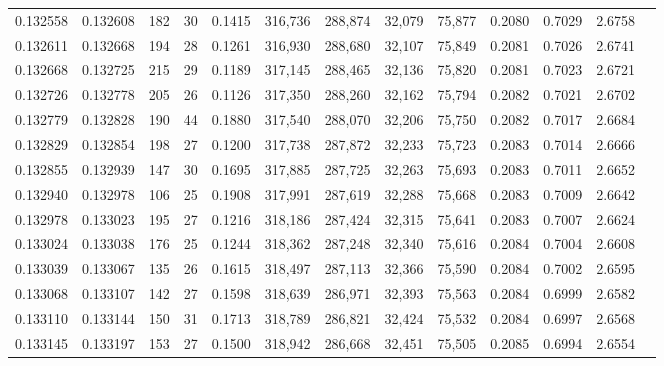 \begin{tabular}{rrrrrrrrrrrrr}
0.132558 & 0.132608 & 182 &  30 &                                     0.1415 & 316,736 & 288,874 &  32,079 &  75,877 & 0.2080 & 0.7029 & 2.6758 \\
0.132611 & 0.132668 & 194 &  28 &                                     0.1261 & 316,930 & 288,680 &  32,107 &  75,849 & 0.2081 & 0.7026 & 2.6741 \\
0.132668 & 0.132725 & 215 &  29 &                                     0.1189 & 317,145 & 288,465 &  32,136 &  75,820 & 0.2081 & 0.7023 & 2.6721 \\
0.132726 & 0.132778 & 205 &  26 &                                     0.1126 & 317,350 & 288,260 &  32,162 &  75,794 & 0.2082 & 0.7021 & 2.6702 \\
0.132779 & 0.132828 & 190 &  44 &                                     0.1880 & 317,540 & 288,070 &  32,206 &  75,750 & 0.2082 & 0.7017 & 2.6684 \\
0.132829 & 0.132854 & 198 &  27 &                                     0.1200 & 317,738 & 287,872 &  32,233 &  75,723 & 0.2083 & 0.7014 & 2.6666 \\
0.132855 & 0.132939 & 147 &  30 &                                     0.1695 & 317,885 & 287,725 &  32,263 &  75,693 & 0.2083 & 0.7011 & 2.6652 \\
0.132940 & 0.132978 & 106 &  25 &                                     0.1908 & 317,991 & 287,619 &  32,288 &  75,668 & 0.2083 & 0.7009 & 2.6642 \\
0.132978 & 0.133023 & 195 &  27 &                                     0.1216 & 318,186 & 287,424 &  32,315 &  75,641 & 0.2083 & 0.7007 & 2.6624 \\
0.133024 & 0.133038 & 176 &  25 &                                     0.1244 & 318,362 & 287,248 &  32,340 &  75,616 & 0.2084 & 0.7004 & 2.6608 \\
0.133039 & 0.133067 & 135 &  26 &                                     0.1615 & 318,497 & 287,113 &  32,366 &  75,590 & 0.2084 & 0.7002 & 2.6595 \\
0.133068 & 0.133107 & 142 &  27 &                                     0.1598 & 318,639 & 286,971 &  32,393 &  75,563 & 0.2084 & 0.6999 & 2.6582 \\
0.133110 & 0.133144 & 150 &  31 &                                     0.1713 & 318,789 & 286,821 &  32,424 &  75,532 & 0.2084 & 0.6997 & 2.6568 \\
0.133145 & 0.133197 & 153 &  27 &                                     0.1500 & 318,942 & 286,668 &  32,451 &  75,505 & 0.2085 & 0.6994 & 2.6554 \\

\end{tabular}
